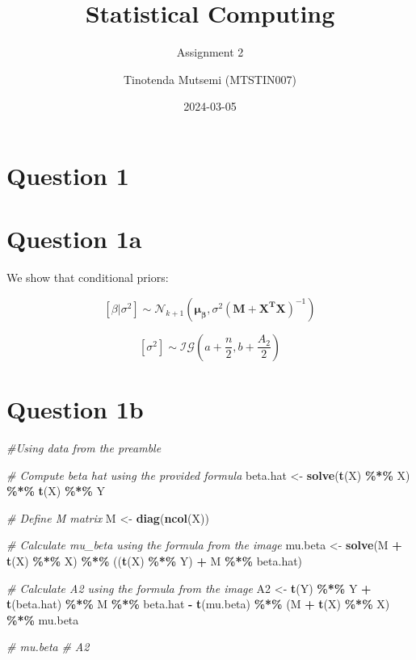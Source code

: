 \documentclass[
]{article}
\title{Statistical Computing}
\subtitle{Assignment 2}
\author{Tinotenda Mutsemi (MTSTIN007)}
\date{2024-03-05}
\newenvironment{Shaded}{\begin{snugshade}}{\end{snugshade}}
\newcommand{\CommentTok}[1]{\textcolor[rgb]{0.56,0.35,0.01}{\textit{#1}}}
\newcommand{\FunctionTok}[1]{\textcolor[rgb]{0.13,0.29,0.53}{\textbf{#1}}}
\newcommand{\NormalTok}[1]{#1}
\newcommand{\OtherTok}[1]{\textcolor[rgb]{0.56,0.35,0.01}{#1}}
\newcommand{\SpecialCharTok}[1]{\textcolor[rgb]{0.81,0.36,0.00}{\textbf{#1}}}
\begin{document}
\maketitle

\hypertarget{question-1}{%
\section{Question 1}\label{question-1}}

\hypertarget{question-1a}{%
\section{Question 1a}\label{question-1a}}

We show that conditional priors:

\[
[\beta|\sigma^2] \sim \mathcal{N}_{k+1}(\boldsymbol{\mu_\beta}, \sigma^2 (\boldsymbol{M + X^TX})^{-1})
\]

\[
[\sigma^2] \sim \mathcal{IG}(a + \frac{n}{2},b + \frac{A_2}{2})
\]

\hypertarget{question-1b}{%
\section{Question 1b}\label{question-1b}}

\begin{Shaded}
\begin{Highlighting}[]
\CommentTok{\#Using data from the preamble}


\CommentTok{\# Compute beta hat using the provided formula}
\NormalTok{beta.hat }\OtherTok{\textless{}{-}} \FunctionTok{solve}\NormalTok{(}\FunctionTok{t}\NormalTok{(X) }\SpecialCharTok{\%*\%}\NormalTok{ X) }\SpecialCharTok{\%*\%} \FunctionTok{t}\NormalTok{(X) }\SpecialCharTok{\%*\%}\NormalTok{ Y}

\CommentTok{\# Define M matrix}
\NormalTok{M }\OtherTok{\textless{}{-}} \FunctionTok{diag}\NormalTok{(}\FunctionTok{ncol}\NormalTok{(X))}

\CommentTok{\# Calculate mu\_beta using the formula from the image}
\NormalTok{mu.beta }\OtherTok{\textless{}{-}} \FunctionTok{solve}\NormalTok{(M }\SpecialCharTok{+} \FunctionTok{t}\NormalTok{(X) }\SpecialCharTok{\%*\%}\NormalTok{ X) }\SpecialCharTok{\%*\%}\NormalTok{ ((}\FunctionTok{t}\NormalTok{(X) }\SpecialCharTok{\%*\%}\NormalTok{ Y) }\SpecialCharTok{+}\NormalTok{ M }\SpecialCharTok{\%*\%}\NormalTok{ beta.hat)}

\CommentTok{\# Calculate A2 using the formula from the image}
\NormalTok{A2 }\OtherTok{\textless{}{-}} \FunctionTok{t}\NormalTok{(Y) }\SpecialCharTok{\%*\%}\NormalTok{ Y }\SpecialCharTok{+} \FunctionTok{t}\NormalTok{(beta.hat) }\SpecialCharTok{\%*\%}\NormalTok{ M }\SpecialCharTok{\%*\%}\NormalTok{ beta.hat }\SpecialCharTok{{-}} \FunctionTok{t}\NormalTok{(mu.beta) }\SpecialCharTok{\%*\%}\NormalTok{ (M }\SpecialCharTok{+} \FunctionTok{t}\NormalTok{(X) }\SpecialCharTok{\%*\%}\NormalTok{ X) }\SpecialCharTok{\%*\%}\NormalTok{ mu.beta}

\CommentTok{\# mu.beta}
\CommentTok{\# A2}
\end{Highlighting}
\end{Shaded}
\end{document}
